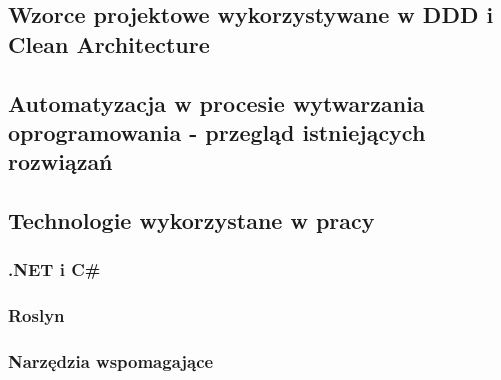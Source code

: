 \subsection{Wzorce projektowe wykorzystywane w DDD i Clean Architecture}

\subsection{Automatyzacja w procesie wytwarzania oprogramowania - przegląd istniejących rozwiązań}

\subsection{Technologie wykorzystane w pracy}

\subsubsection{.NET i C\#}

\subsubsection{Roslyn}

\subsubsection{Narzędzia wspomagające}